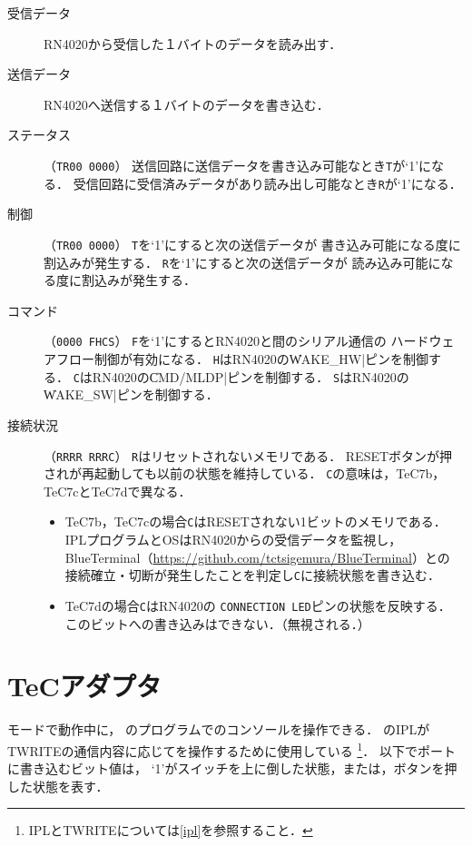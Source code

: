 \begin{description}
\item[受信データ]
  RN4020から受信した１バイトのデータを読み出す．
\item[送信データ]
  RN4020へ送信する１バイトのデータを書き込む．
\item[ステータス]（\texttt{TR00 0000}）
  送信回路に送信データを書き込み可能なとき\texttt{T}が`1'になる．
  受信回路に受信済みデータがあり読み出し可能なとき\texttt{R}が`1'になる．
\item[制御]（\texttt{TR00 0000}）
  \texttt{T}を`1'にすると次の送信データが
  書き込み可能になる度に割込みが発生する．
  \texttt{R}を`1'にすると次の送信データが
  読み込み可能になる度に割込みが発生する．
\item[コマンド]（\texttt{0000 FHCS}）
  \texttt{F}を`1'にするとRN4020と{\tac}間のシリアル通信の
  ハードウェアフロー制御が有効になる．
  \texttt{H}はRN4020の\|WAKE_HW|ピンを制御する．
  \texttt{C}はRN4020の\|CMD/MLDP|ピンを制御する．
  \texttt{S}はRN4020の\|WAKE_SW|ピンを制御する．
\item[接続状況]（\texttt{RRRR RRRC}）
  \texttt{R}はリセットされないメモリである．
  RESETボタンが押され{\tac}が再起動しても以前の状態を維持している．
  \texttt{C}の意味は，TeC7b，TeC7cとTeC7dで異なる．
  \begin{itemize}
  \item TeC7b，TeC7cの場合\texttt{C}はRESETされない1ビットのメモリである．
    IPLプログラムとOSはRN4020からの受信データを監視し，
    BlueTerminal（\url{https://github.com/tctsigemura/BlueTerminal}）との
    接続確立・切断が発生したことを判定し\texttt{C}に接続状態を書き込む．
  \item TeC7dの場合\texttt{C}はRN4020の
    \texttt{CONNECTION LED}ピンの状態を反映する．
    このビットへの書き込みはできない．（無視される．）
  \end{itemize}
\end{description}

\section{TeCアダプタ}
{\tec}モードで動作中に，
{\tac}のプログラムで{\tec}のコンソールを操作できる．
{\tac}のIPLがTWRITEの通信内容に応じて{\tec}を操作するために使用している
\footnote{IPLとTWRITEについては\ref{ipl}を参照すること．}．
以下でポートに書き込むビット値は，
`1'がスイッチを上に倒した状態，または，ボタンを押した状態を表す．


